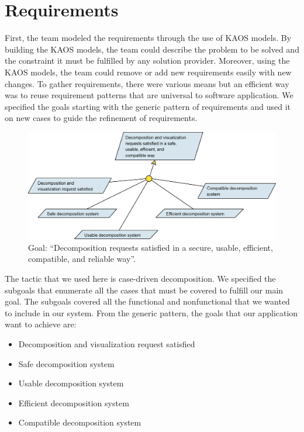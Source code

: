 \section{Requirements}
First, the team modeled the requirements through the use of KAOS models\cite{b2}. By building the KAOS models, the team could describe the problem to be solved and the constraint it must be fulfilled by any solution provider. Moreover, using the KAOS models, the team could remove or add new requirements easily with new changes. To gather requirements, there were various means but an efficient way was to reuse requirement patterns that are universal to software application. We specified the goals starting with the generic pattern of requirements and used it on new cases to guide the refinement of requirements.

\begin{figure}
\centerline{\includegraphics[width=\textwidth,height=\textheight,keepaspectratio]{./figure/GoalsNFR1.png}}
\caption{Goal: “Decomposition requests satisfied in a secure, usable, efficient, compatible, and reliable way”.}
\end{figure}

The tactic that we used here is case-driven decomposition. We specified the subgoals that enumerate all the cases that must be covered to fulfill our main goal. The subgoals covered all the functional and nonfunctional that we wanted to include in our system. From the generic pattern, the goals that our application want to achieve are:

\begin{itemize}
	\item Decomposition and visualization request satisfied
	\item Safe decomposition system
	\item Usable decomposition system
	\item Efficient decomposition system
	\item Compatible decomposition system
\end{itemize}

